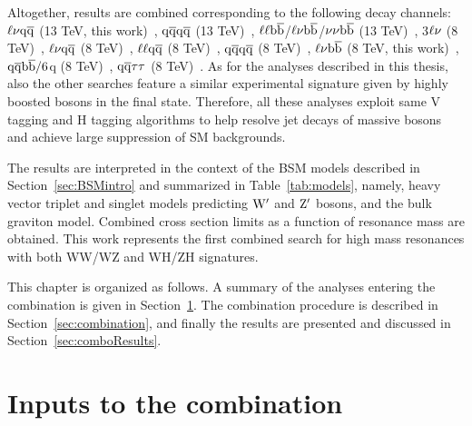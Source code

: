 Altogether, results are combined corresponding to the following decay channels: $\ell \nu \mathrm{q}\overline{\mathrm{q}}$ (13 TeV, this work)~\cite{CMS-PAS-EXO-15-002}, $\mathrm{q}\overline{\mathrm{q}} \mathrm{q}\overline{\mathrm{q}}$ (13 TeV)~\cite{CMS-PAS-EXO-15-002},
$\ell \ell {\mathrm{b}\overline{\mathrm{b}}}$/$\ell \nu {\mathrm{b}\overline{\mathrm{b}}}$/$\nu \nu {\mathrm{b}\overline{\mathrm{b}}}$ (13 TeV)~\cite{Khachatryan:2016cfx},
3$\ell\nu$ (8 TeV)~\cite{Khachatryan:2014xja}, 
$\ell \nu \mathrm{q}\overline{\mathrm{q}}$ (8 TeV)~\cite{Khachatryan:2014gha}, $\ell\ell \mathrm{q}\overline{\mathrm{q}}$ (8 TeV)~\cite{Khachatryan:2014gha}, 
$\mathrm{q}\overline{\mathrm{q}} \mathrm{q}\overline{\mathrm{q}}$ (8 TeV)~\cite{Khachatryan:2014hpa}, 
$\ell \nu {\mathrm{b}\overline{\mathrm{b}}}$ (8 TeV, this work)~\cite{Khachatryan:2016yji}, $\mathrm{q}\overline{\mathrm{q}}{\mathrm{b}\overline{\mathrm{b}}}/6$q (8 TeV)~\cite{Khachatryan:2015bma}, 
$\mathrm{q}\overline{\mathrm{q}} \tau\tau $ (8 TeV)~\cite{Khachatryan:2015ywa}.
As for the analyses described in this thesis, also the other searches feature a similar experimental signature given by highly boosted bosons in the final state.
Therefore, all these analyses exploit same V tagging and H tagging algorithms to help resolve jet decays of massive bosons and achieve large suppression of SM backgrounds.

The results are interpreted in the context of the BSM models described in Section~\ref{sec:BSMintro} and summarized in Table~\ref{tab:models}, namely, heavy vector triplet and singlet models predicting $\mathrm{W}^\prime$ and $\mathrm{Z}^\prime$ bosons, and the bulk graviton model.
Combined cross section limits as a function of resonance mass are obtained. This work represents the first combined search for high mass resonances with both WW/WZ and WH/ZH signatures.

This chapter is organized as follows.
A summary of the analyses entering the combination is given in Section~\ref{sec:analyses}.
The combination procedure is described in Section~\ref{sec:combination}, and finally the results are presented and discussed in Section~\ref{sec:comboResults}.

\section{Inputs to the combination}\label{sec:analyses}


